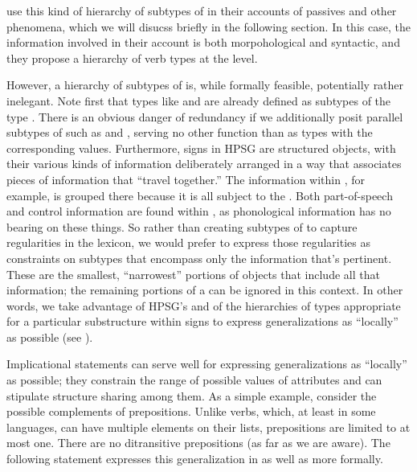 \documentclass[output=paper
 	        ,biblatex
                ,babelshorthands
                ,newtxmath
                ,draftmode
                ,colorlinks, citecolor=brown
]{langscibook}
\begin{document}
\citet{AckermanandWebelhuth1998}
 use this kind of hierarchy of subtypes of  in their accounts of  passives and other phenomena, which we will disucss briefly in the following section.
In this case, the information involved in their account is both morpohological and syntactic, and they propose a hierarchy of verb types at the  level.

However, a hierarchy of subtypes of  is, while formally feasible, potentially rather inelegant.
Note first that types like  and  are already defined as subtypes of the type .
There is an obvious danger of redundancy if we additionally posit parallel subtypes of  such as  and  , serving no other function than as types with the corresponding  values.
Furthermore, signs in HPSG are structured objects, with their various kinds of information deliberately arranged in a way that associates pieces of information that ``travel together.''
The information within , for example, is grouped there because it is all subject to the .
Both part-of-speech and control information are found within , as phonological information has no bearing on these things.
So rather than creating subtypes of  to capture regularities in the lexicon, we would prefer to express those regularities as constraints on subtypes that encompass only the information that's pertinent.
These are the smallest, ``narrowest'' portions of  objects that include all that information; the remaining portions of a  can be ignored in this context.
In other words, we take advantage of HPSG's  and of the hierarchies of types appropriate for a particular substructure within signs to express generalizations as ``locally'' as possible (see ).

Implicational statements  can serve well for expressing generalizations as ``locally'' as possible; they constrain the range of possible values of attributes and can stipulate structure sharing among them.
As a simple example, consider the possible complements of prepositions.
Unlike verbs, which, at least in some languages, can have multiple elements on their  lists, prepositions are limited to at most one.
There are no ditransitive prepositions (as far as we are aware).
The following statement expresses this generalization in  as well as more formally.
\end{document}
